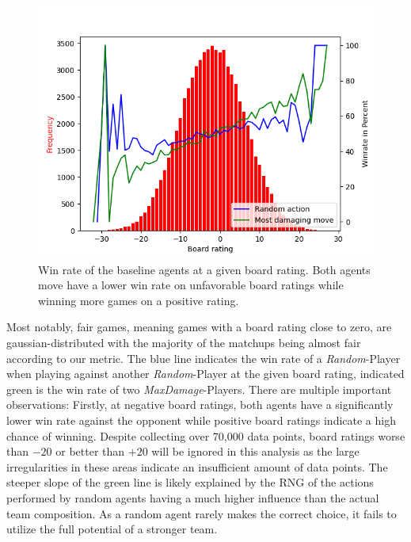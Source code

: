 \begin{figure}[h]
	\centering
	\includegraphics[width=\textwidth]{images/boardrating.png}
	\caption{Win rate of the baseline agents at a given board rating. Both agents
  move have a lower win rate on unfavorable board ratings while winning more games on a positive rating.}
	\label{fig:wr-board-rating}
\end{figure}
Most notably, fair games, meaning games with a board rating close to zero, are gaussian-distributed with the majority
of the matchups being almost fair according to our metric. The blue line indicates the win rate of a \textit{Random}-Player
when playing against another \textit{Random}-Player at the given board rating, indicated green is the win rate of two
\textit{MaxDamage}-Players. There are multiple important observations: Firstly, at negative board ratings, both
agents have a significantly lower win rate against the opponent while positive board ratings indicate a high chance of 
winning. Despite collecting over 70,000 data points, board ratings worse than $-20$ or better than $+20$ will be ignored in this analysis
as the large irregularities in these areas indicate an insufficient amount of data points. 
The steeper slope of the green line is likely explained by the \ac{RNG} of the actions performed by random agents having 
a much higher influence than the actual team composition. As a random agent rarely makes the correct choice, it 
fails to utilize the full potential of a stronger team. 

